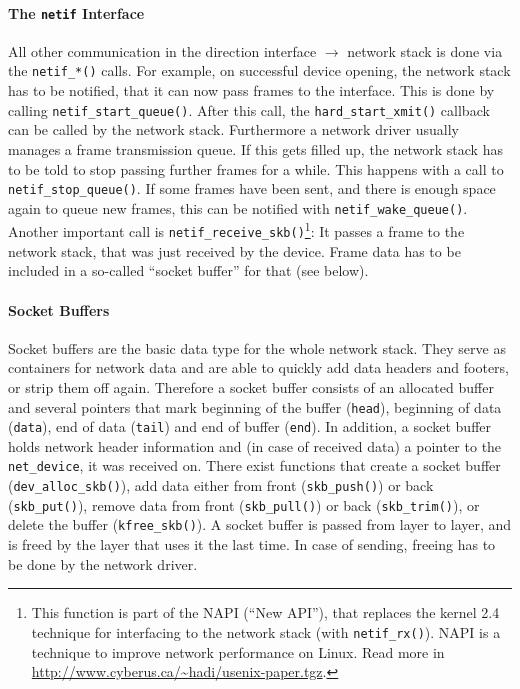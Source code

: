 \documentclass[a4paper,12pt,BCOR6mm,bibtotoc,idxtotoc]{scrbook}
\begin{document}
\paragraph{The \lstinline+netif+ Interface} All other
communication in the direction interface $\to$ network stack is done via the
\lstinline+netif_*()+ calls. For example, on successful device opening, the
network stack has to be notified, that it can now pass frames to the
interface. This is done by calling \lstinline+netif_start_queue()+. After this
call, the \lstinline+hard_start_xmit()+ callback can be called by the network
stack. Furthermore a network driver usually manages a frame transmission
queue.  If this gets filled up, the network stack has to be told to stop
passing further frames for a while. This happens with a call to
\lstinline+netif_stop_queue()+. If some frames have been sent, and there is
enough space again to queue new frames, this can be notified with
\lstinline+netif_wake_queue()+. Another important call is
\lstinline+netif_receive_skb()+\footnote{This function is part of the NAPI
(``New API''), that replaces the kernel 2.4 technique for interfacing to the
network stack (with \lstinline+netif_rx()+). NAPI is a technique to improve
network performance on Linux. Read more in
\url{http://www.cyberus.ca/~hadi/usenix-paper.tgz}.}: It passes a frame to the
network stack, that was just received by the device. Frame data has to be
included in a so-called ``socket buffer'' for that (see below).

\paragraph{Socket Buffers} Socket buffers are the basic
data type for the whole network stack. They serve as containers for network
data and are able to quickly add data headers and footers, or strip them off
again. Therefore a socket buffer consists of an allocated buffer and several
pointers that mark beginning of the buffer (\lstinline+head+), beginning of
data (\lstinline+data+), end of data (\lstinline+tail+) and end of buffer
(\lstinline+end+). In addition, a socket buffer holds network header
information and (in case of received data) a pointer to the
\lstinline+net_device+, it was received on. There exist functions that create
a socket buffer (\lstinline+dev_alloc_skb()+), add data either from front
(\lstinline+skb_push()+) or back (\lstinline+skb_put()+), remove data from
front (\lstinline+skb_pull()+) or back (\lstinline+skb_trim()+), or delete the
buffer (\lstinline+kfree_skb()+).  A socket buffer is passed from layer to
layer, and is freed by the layer that uses it the last time. In case of
sending, freeing has to be done by the network driver.
\end{document}
